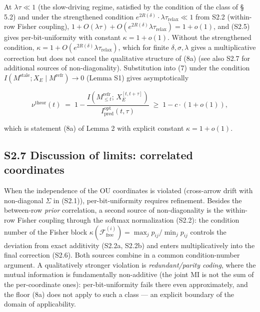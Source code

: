 \documentclass[pdflatex,sn-mathphys-ay]{sn-jnl}
\begin{document}
At \(\lambda \tau \ll 1\) (the slow-driving regime, satisfied by the condition of the class of § 5.2) and under the strengthened condition \(e^{2R(\delta)} \cdot \lambda \tau_{\text{relax}} \ll 1\) from S2.2 (within-row Fisher coupling), \(1 + O(\lambda \tau) + O(e^{2R(\delta)} \lambda \tau_{\text{relax}}) = 1 + o(1)\), and (S2.5) gives per-bit-uniformity with constant \(\kappa = 1 + o(1)\). Without the strengthened condition, \(\kappa = 1 + O(e^{2R(\delta)} \lambda \tau_{\text{relax}})\), which for finite \(\delta, \sigma, \lambda\) gives a multiplicative correction but does not cancel the qualitative structure of (8a) (see also S2.7 for additional sources of non-diagonality). Substitution into (7) under the condition \(I(M^{\text{stale}}; X_E \mid M^{\text{refr}}) \to 0\) (Lemma S1) gives asymptotically



\begin{equation}\nu^{\text{theor}}(t) \;=\; 1 - \frac{I(M_{\le t}^{\text{refr}};\, X_E^{[t, t+\tau]})}{I_{\text{pred}}^{\text{opt}}(t, \tau)} \;\ge\; 1 - c \cdot (1 + o(1)), \tag{S2.6}\end{equation}



which is statement (8a) of Lemma 2 with explicit constant \(\kappa = 1 + o(1)\).



\subsection*{S2.7 Discussion of limits: correlated coordinates}\label{s2.7-discussion-of-limits-correlated-coordinates}



When the independence of the OU coordinates is violated (cross-arrow drift with non-diagonal \(\Sigma\) in (S2.1)), per-bit-uniformity requires refinement. Besides the between-row \emph{prior} correlation, a second source of non-diagonality is the within-row Fisher coupling through the softmax normalization (S2.2): the condition number of the Fisher block \(\kappa(\mathcal{F}^{(i)}_{\text{free}}) = \max_j p_{ij} / \min_j p_{ij}\) controls the deviation from exact additivity (S2.2a, S2.2b) and enters multiplicatively into the final correction (S2.6). Both sources combine in a common condition-number argument. A qualitatively stronger violation is \emph{redundant/parity coding}, where the mutual information is fundamentally non-additive (the joint MI is not the sum of the per-coordinate ones): per-bit-uniformity fails there even approximately, and the floor (8a) does not apply to such a class --- an explicit boundary of the domain of applicability.
\end{document}
